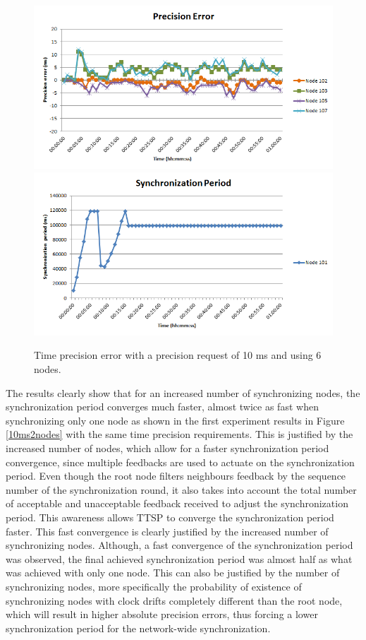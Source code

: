 \begin{figure}[!htb]
\begin{center}
\includegraphics[scale=0.4]{./images/11-ttsp-10ms6nodes-error.png}
\includegraphics[scale=0.4]{./images/12-ttsp-10ms6nodes-period.png}
\end{center}
\caption{Time precision error with a precision request of 10 ms and using 6 nodes.}
\label{10ms6nodes}
\end{figure}

The results clearly show that for an increased number of synchronizing nodes, the synchronization period converges much faster, almost twice as fast when synchronizing only one node as shown in the first experiment results in Figure \ref{10ms2nodes} with the same time precision requirements. This is justified by the increased number of nodes, which allow for a faster synchronization period convergence, since multiple feedbacks are used to actuate on the synchronization period. Even though the root node filters neighbours feedback by the sequence number of the synchronization round, it also takes into account the total number of acceptable and unacceptable feedback received to adjust the synchronization period.
This awareness allows TTSP to converge the synchronization period faster. This fast convergence is clearly justified by the increased number of synchronizing nodes. Although, a fast convergence of the synchronization period was observed, the final achieved synchronization period was almost half as what was achieved with only one node. This can also be justified by the number of synchronizing nodes, more specifically the probability of existence of synchronizing nodes with clock drifts completely different than the root node, which will result in higher absolute precision errors, thus forcing a lower synchronization period for the network-wide synchronization.

